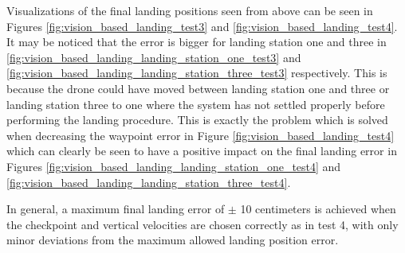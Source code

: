 \documentclass[../Head/report.tex]{subfiles}
\begin{document}
Visualizations of the final landing positions seen from above can be seen in Figures \ref{fig:vision_based_landing_test3} and \ref{fig:vision_based_landing_test4}. It may be noticed that the error is bigger for landing station one and three in \ref{fig:vision_based_landing_landing_station_one_test3} and \ref{fig:vision_based_landing_landing_station_three_test3} respectively. This is because the drone could have moved between landing station one and three or landing station three to one where the system has not settled properly before performing the landing procedure. This is exactly the problem which is solved when decreasing the waypoint error in Figure \ref{fig:vision_based_landing_test4} which can clearly be seen to have a positive impact on the final landing error in Figures \ref{fig:vision_based_landing_landing_station_one_test4} and \ref{fig:vision_based_landing_landing_station_three_test4}.  

In general, a maximum final landing error of $\pm$ 10 centimeters is achieved when the checkpoint and vertical velocities are chosen correctly as in test 4, with only minor deviations from the maximum allowed landing position error. 
\end{document}
